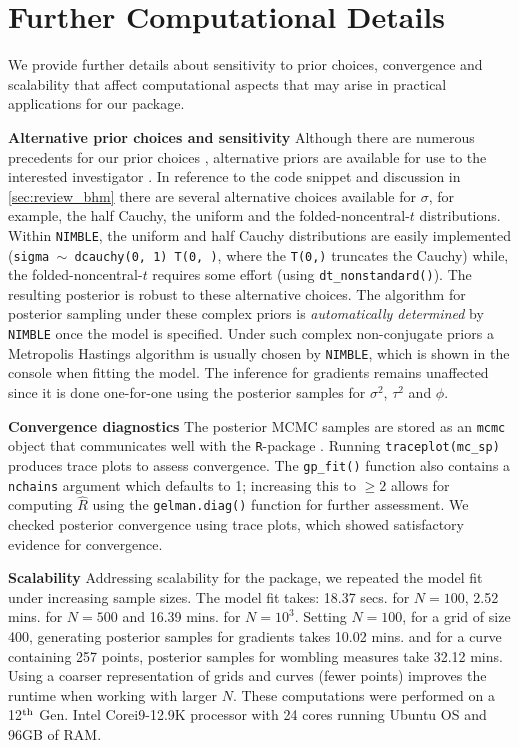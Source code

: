{
\section{Further Computational Details}
We provide further details about sensitivity to prior choices, convergence and scalability that affect computational aspects that may arise in practical applications for our package.

\noindent \textbf{Alternative prior choices and sensitivity}
Although there are numerous precedents for our prior choices \citep[see, for e.g.,][]{banerjee2006bayesian,loro_bayesian_2023,halder2024bayesian}, alternative priors are available for use to the interested investigator \citep[see, for e.g.,][]{gelman2006prior}. In reference to the code snippet and discussion in \ref{sec:review_bhm} there are several alternative choices available for $\sigma$, for example, the half Cauchy, the uniform and the folded-noncentral-$t$ distributions. Within \texttt{NIMBLE}, the uniform and half Cauchy distributions are easily implemented (\texttt{sigma $\sim$ dcauchy(0, 1) T(0, )}, where the \texttt{T(0,)} truncates the Cauchy) while, the folded-noncentral-$t$ requires some effort (using \texttt{dt\_nonstandard()}). The resulting posterior is robust to these alternative choices. The algorithm for posterior sampling under these complex priors is \emph{automatically determined} by \texttt{NIMBLE} once the model is specified. Under such complex non-conjugate priors a Metropolis Hastings algorithm is usually chosen by \texttt{NIMBLE}, which is shown in the console when fitting the model. The inference for gradients remains unaffected since it is done one-for-one using the posterior samples for $\sigma^2$, $\tau^2$ and $\phi$.  

\noindent \textbf{Convergence diagnostics} The posterior MCMC samples are stored as an \texttt{mcmc} object that communicates well with the \texttt{R}-package . Running \texttt{traceplot(mc\_sp)} produces trace plots to assess convergence. The \texttt{gp\_fit()} function also contains a \texttt{nchains} argument which defaults to 1; increasing this to $\geq2$ allows for computing $\widehat{R}$ using the \texttt{gelman.diag()} function for further assessment. We checked posterior convergence using trace plots, which showed satisfactory evidence for convergence.

\noindent \textbf{Scalability} Addressing scalability for the package, we repeated the model fit under increasing sample sizes. The model fit takes: 18.37 secs. for $N=100$, 2.52 mins. for $N=500$ and 16.39 mins. for $N=10^3$. Setting $N=100$, for a grid of size 400, generating posterior samples for gradients takes 10.02 mins. and for a curve containing 257 points, posterior samples for wombling measures take 32.12 mins. Using a coarser representation of grids and curves (fewer points) improves the runtime when working with larger $N$. These computations were performed on a 12$^{\rm th}$ Gen. Intel \textregistered Core\texttrademark  i9-12.9K processor with 24 cores running Ubuntu OS and 96GB of RAM.
}

